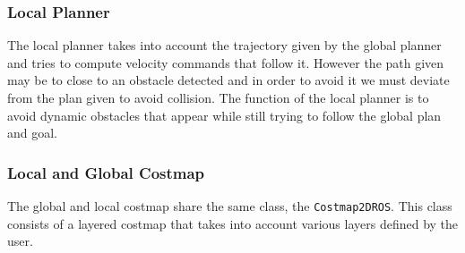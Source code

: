 \documentclass[12pt]{article}
\begin{document}
\subsubsection{Local Planner}
The local planner takes into account the trajectory given by the global planner and tries to compute velocity commands that follow it. However the path given may be to close to an obstacle detected and in order to avoid it we must deviate from the plan given to avoid collision. The function of the local planner is to avoid dynamic obstacles that appear while still trying to follow the global plan and goal. 

\subsubsection{Local and Global Costmap}
The global and local costmap share the same class, the  \texttt{Costmap2DROS}. This class consists of a layered costmap that takes into account various layers defined by the user.
\end{document}
